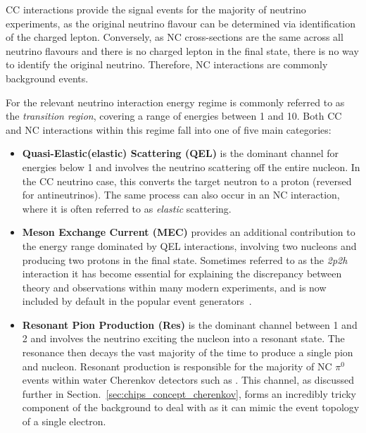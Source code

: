 CC interactions provide the signal events for the majority of neutrino experiments, as the
original neutrino flavour can be determined via identification of the charged lepton. Conversely,
as NC cross-sections are the same across all neutrino flavours and there is no charged lepton in
the final state, there is no way to identify the original neutrino. Therefore, NC interactions are
commonly background events.

For \chips the relevant neutrino interaction energy regime is commonly referred to as the
\emph{transition region}, covering a range of energies between 1 and \unit{10}{\GeV}. Both CC and
NC interactions within this regime fall into one of five main categories:
\begin{itemize}
    \item \textbf{Quasi-Elastic(elastic) Scattering (QEL)} is the dominant channel for energies
          below \unit{1}{\GeV} and involves the neutrino scattering off the entire nucleon. In the
          CC neutrino case, this converts the target neutron to a proton (reversed for
          antineutrinos). The same process can also occur in an NC interaction, where it is often
          referred to as \emph{elastic} scattering.

    \item \textbf{Meson Exchange Current (MEC)} provides an additional contribution to the energy
          range dominated by QEL interactions, involving two nucleons and producing two protons in
          the final state. Sometimes referred to as the \emph{2p2h} interaction it has become
          essential for explaining the discrepancy between theory and observations within many
          modern experiments, and is now included by default in the popular event
          generators~\cite{katori2013}.

    \item \textbf{Resonant Pion Production (Res)} is the dominant channel between 1 and
          \unit{2}{\GeV} and involves the neutrino exciting the nucleon into a resonant state. The
          resonance then decays the vast majority of the time to produce a single pion and
          nucleon. Resonant production is responsible for the majority of NC $\pi^{0}$ events
          within water Cherenkov detectors such as \chips. This channel, as discussed further in
          Section.~\ref{sec:chips_concept_cherenkov}, forms an incredibly tricky component of the
          background to deal with as it can mimic the event topology of a single electron.


\end{itemize}
